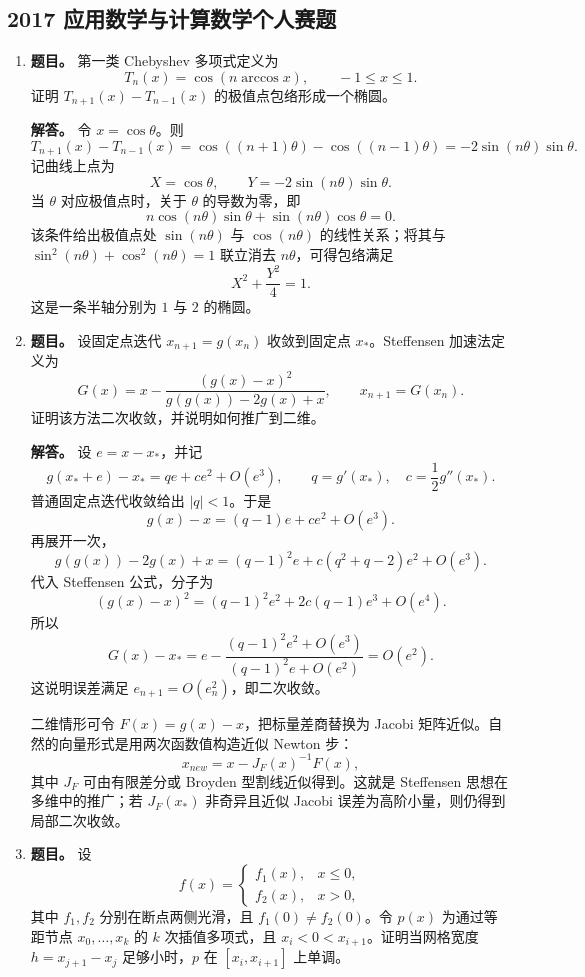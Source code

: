 ﻿\documentclass[UTF8,12pt]{ctexart}
\begin{document}
\subsection{2017 应用数学与计算数学个人赛题}
\begin{enumerate}[label=\textbf{\arabic*.},leftmargin=2.2em]
\item \textbf{题目。} 第一类 Chebyshev 多项式定义为
\[
T_n(x)=\cos(n\arccos x),\qquad -1\le x\le1.
\]
证明 \(T_{n+1}(x)-T_{n-1}(x)\) 的极值点包络形成一个椭圆。

\textbf{解答。} 令 \(x=\cos\theta\)。则
\[
T_{n+1}(x)-T_{n-1}(x)
=\cos((n+1)\theta)-\cos((n-1)\theta)
=-2\sin(n\theta)\sin\theta.
\]
记曲线上点为
\[
X=\cos\theta,
\qquad
Y=-2\sin(n\theta)\sin\theta.
\]
当 \(\theta\) 对应极值点时，关于 \(\theta\) 的导数为零，即
\[
n\cos(n\theta)\sin\theta+\sin(n\theta)\cos\theta=0.
\]
该条件给出极值点处 \(\sin(n\theta)\) 与 \(\cos(n\theta)\) 的线性关系；将其与
\(\sin^2(n\theta)+\cos^2(n\theta)=1\) 联立消去 \(n\theta\)，可得包络满足
\[
X^2+\frac{Y^2}{4}=1.
\]
这是一条半轴分别为 \(1\) 与 \(2\) 的椭圆。

\item \textbf{题目。} 设固定点迭代 \(x_{n+1}=g(x_n)\) 收敛到固定点 \(x_*\)。Steffensen 加速法定义为
\[
G(x)=x-\frac{(g(x)-x)^2}{g(g(x))-2g(x)+x},
\qquad x_{n+1}=G(x_n).
\]
证明该方法二次收敛，并说明如何推广到二维。

\textbf{解答。} 设 \(e=x-x_*\)，并记
\[
g(x_*+e)-x_*=qe+ce^2+O(e^3),
\qquad q=g'(x_*),\quad c=\frac12g''(x_*).
\]
普通固定点迭代收敛给出 \(|q|<1\)。于是
\[
g(x)-x=(q-1)e+ce^2+O(e^3).
\]
再展开一次，
\[
g(g(x))-2g(x)+x=(q-1)^2e+c(q^2+q-2)e^2+O(e^3).
\]
代入 Steffensen 公式，分子为
\[
(g(x)-x)^2=(q-1)^2e^2+2c(q-1)e^3+O(e^4).
\]
所以
\[
G(x)-x_*=e-\frac{(q-1)^2e^2+O(e^3)}{(q-1)^2e+O(e^2)}=O(e^2).
\]
这说明误差满足 \(e_{n+1}=O(e_n^2)\)，即二次收敛。

二维情形可令 \(F(x)=g(x)-x\)，把标量差商替换为 Jacobi 矩阵近似。自然的向量形式是用两次函数值构造近似 Newton 步：
\[
x_{new}=x-J_F(x)^{-1}F(x),
\]
其中 \(J_F\) 可由有限差分或 Broyden 型割线近似得到。这就是 Steffensen 思想在多维中的推广；若 \(J_F(x_*)\) 非奇异且近似 Jacobi 误差为高阶小量，则仍得到局部二次收敛。

\item \textbf{题目。} 设
\[
f(x)=\begin{cases}
f_1(x),&x\le0,\\
f_2(x),&x>0,
\end{cases}
\]
其中 \(f_1,f_2\) 分别在断点两侧光滑，且 \(f_1(0)\ne f_2(0)\)。令 \(p(x)\) 为通过等距节点 \(x_0,\ldots,x_k\) 的 \(k\) 次插值多项式，且 \(x_i<0<x_{i+1}\)。证明当网格宽度 \(h=x_{j+1}-x_j\) 足够小时，\(p\) 在 \([x_i,x_{i+1}]\) 上单调。


\end{enumerate}
\end{document}
